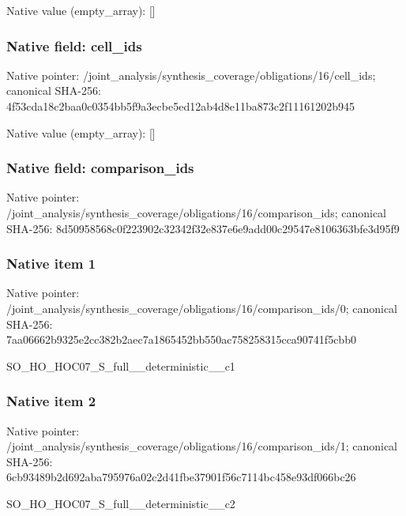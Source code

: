 \documentclass[10pt,a4paper]{article}
\begin{document}
Native value (empty\_\allowbreak{}array): []

\subsubsection{Native field: cell\_\allowbreak{}ids}
Native pointer: /joint\_\allowbreak{}analysis/synthesis\_\allowbreak{}coverage/obligations/16/cell\_\allowbreak{}ids; canonical SHA-256: 4f53cda18c2baa0c0354bb5f9a3ecbe5ed12ab4d8e11ba873c2f11161202b945

Native value (empty\_\allowbreak{}array): []

\subsubsection{Native field: comparison\_\allowbreak{}ids}
Native pointer: /joint\_\allowbreak{}analysis/synthesis\_\allowbreak{}coverage/obligations/16/comparison\_\allowbreak{}ids; canonical SHA-256: 8d50958568c0f223902c32342f32e837e6e9add00c29547e8106363bfe3d95f9

\subsubsection{Native item 1}
Native pointer: /joint\_\allowbreak{}analysis/synthesis\_\allowbreak{}coverage/obligations/16/comparison\_\allowbreak{}ids/0; canonical SHA-256: 7aa06662b9325e2cc382b2aec7a1865452bb550ac758258315cca90741f5cbb0

\begingroup\raggedright\sloppy SO\_\allowbreak{}HO\_\allowbreak{}HOC07\_\allowbreak{}S\_\allowbreak{}full\_\allowbreak{}\_\allowbreak{}deterministic\_\allowbreak{}\_\allowbreak{}c1\par\endgroup

\subsubsection{Native item 2}
Native pointer: /joint\_\allowbreak{}analysis/synthesis\_\allowbreak{}coverage/obligations/16/comparison\_\allowbreak{}ids/1; canonical SHA-256: 6cb93489b2d692aba795976a02c2d41fbe37901f56c7114bc458e93df066bc26

\begingroup\raggedright\sloppy SO\_\allowbreak{}HO\_\allowbreak{}HOC07\_\allowbreak{}S\_\allowbreak{}full\_\allowbreak{}\_\allowbreak{}deterministic\_\allowbreak{}\_\allowbreak{}c2\par\endgroup
\end{document}
